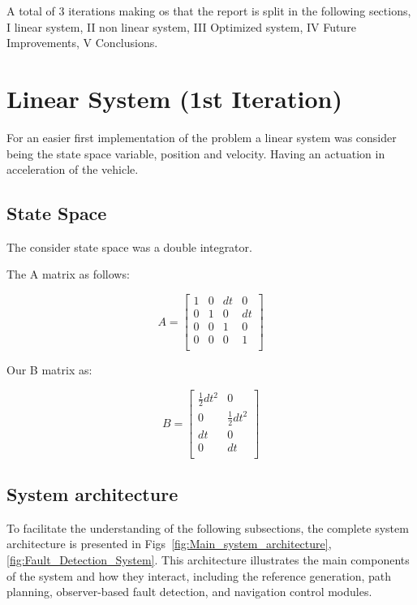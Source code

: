 \documentclass[12pt]{article}
\begin{document}
A total of 3 iterations making os that the report is split in the following sections, I linear system, II non linear system,
III Optimized system, IV Future Improvements, V Conclusions.\\

\section{Linear System (1st Iteration)}
For an easier first implementation of the problem a linear system was consider being the state space variable, position and velocity.
Having an actuation in acceleration of the vehicle.

\subsection{State Space}
The consider state space was a double integrator.

The A matrix as follows:

\begin{equation*}
    A = 
    \begin{bmatrix}
     1& 0& dt& 0\\
     0& 1& 0& dt\\
     0& 0& 1& 0\\
     0& 0& 0& 1\\
    \end{bmatrix}
\end{equation*}

Our B matrix as: 

\begin{equation*}
    B = 
    \begin{bmatrix}
    \frac{1}{2} dt^2 & 0\\
    0& \frac{1}{2} dt^2\\
    dt& 0\\
    0& dt\\
    \end{bmatrix}
\end{equation*}

\subsection{System architecture}

To facilitate the understanding of the following subsections, the complete system architecture is presented 
in Figs~\ref{fig:Main_system_architecture},\ref{fig:Fault_Detection_System}. 
This architecture illustrates the main components of the system and how they interact, including the reference 
generation, path planning, observer-based fault detection, and navigation control modules.
\end{document}
